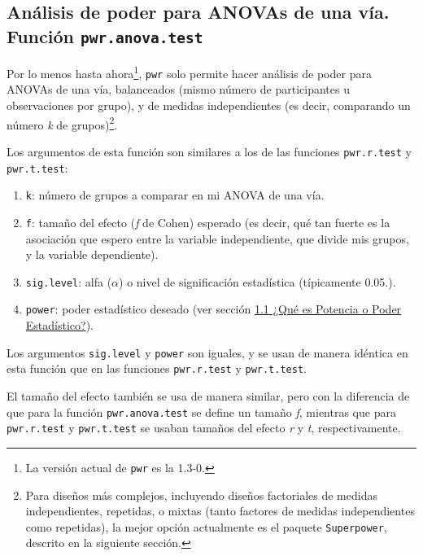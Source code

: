 \documentclass[
]{article}
\providecommand{\tightlist}{%
  \setlength{\itemsep}{0pt}\setlength{\parskip}{0pt}}
\begin{document}
\hypertarget{anuxe1lisis-de-poder-para-anovas-de-una-vuxeda.-funciuxf3n-pwr.anova.test}{%
\subsection{\texorpdfstring{Análisis de poder para ANOVAs de una vía.
Función
\texttt{pwr.anova.test}}{Análisis de poder para ANOVAs de una vía. Función pwr.anova.test}}\label{anuxe1lisis-de-poder-para-anovas-de-una-vuxeda.-funciuxf3n-pwr.anova.test}}

Por lo menos hasta ahora\footnote{La versión actual de \texttt{pwr} es
  la 1.3-0.}, \texttt{pwr} solo permite hacer análisis de poder para
ANOVAs de una vía, balanceados (mismo número de participantes u
observaciones por grupo), y de medidas independientes (es decir,
comparando un número \emph{k} de grupos)\footnote{Para diseños más
  complejos, incluyendo diseños factoriales de medidas independientes,
  repetidas, o mixtas (tanto factores de medidas independientes como
  repetidas), la mejor opción actualmente es el paquete
  \texttt{Superpower}, descrito en la siguiente sección.}.

Los argumentos de esta función son similares a los de las funciones
\texttt{pwr.r.test} y \texttt{pwr.t.test}:

\begin{enumerate}
\def\labelenumi{\arabic{enumi}.}
\tightlist
\item
  \texttt{k}: número de grupos a comparar en mi ANOVA de una vía.
\item
  \texttt{f}: tamaño del efecto (\emph{f} de Cohen) esperado (es decir,
  qué tan fuerte es la asociación que espero entre la variable
  independiente, que divide mis grupos, y la variable dependiente).
\item
  \texttt{sig.level}: alfa (\(\alpha\)) o nivel de significación
  estadística (típicamente 0.05.).
\item
  \texttt{power}: poder estadístico deseado (ver sección
  \protect\hyperlink{power}{1.1 ¿Qué es Potencia o Poder Estadístico?}).
\end{enumerate}

Los argumentos \texttt{sig.level} y \texttt{power} son iguales, y se
usan de manera idéntica en esta función que en las funciones
\texttt{pwr.r.test} y \texttt{pwr.t.test}.

El tamaño del efecto también se usa de manera similar, pero con la
diferencia de que para la función \texttt{pwr.anova.test} se define un
tamaño \emph{f}, mientras que para \texttt{pwr.r.test} y
\texttt{pwr.t.test} se usaban tamaños del efecto \emph{r} y \emph{t},
respectivamente.
\end{document}

